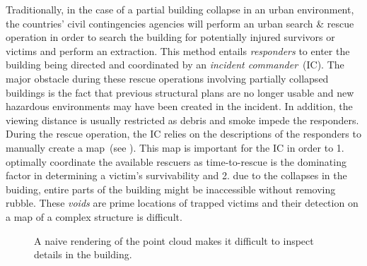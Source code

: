 Traditionally, in the case of a partial building collapse in an urban environment, the countries' civil contingencies agencies will perform an urban search \& rescue operation in order to search the building for potentially injured survivors or victims and perform an extraction.  This method entails \emph{responders} to enter the building being directed and coordinated by an \emph{incident commander}~(IC).  The major obstacle during these rescue operations involving partially collapsed buildings is the fact that previous structural plans are no longer usable and new hazardous environments may have been created in the incident.  In addition, the viewing distance is usually restricted as debris and smoke impede the responders.  During the rescue operation, the IC relies on the descriptions of the responders to manually create a map~(see ).  This map is important for the IC in order to 1. optimally coordinate the available rescuers as time-to-rescue is the dominating factor in determining a victim's survivability and 2. due to the collapses in the buiding, entire parts of the building might be inaccessible without removing rubble.  These \emph{voids} are prime locations of trapped victims and their detection on a  map of a complex  structure is difficult.

\begin{figure}
\centering
{}
\caption{A naive rendering of the point cloud makes it difficult to inspect details in the building.}
\label{contributions:usar:map:pointcloud}
\end{figure}

